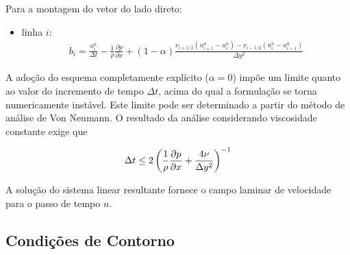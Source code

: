 Para a montagem do vetor do lado direto:

\begin{itemize}
	\item{linha $i$:}
		\begin{eqnarray}
			b_i = \frac{u_i^{n}}{\Delta t} 
			-\frac{1}{\rho}\frac{\partial p}{\partial x} 
			+(1-\alpha)\frac{\nu_{i+1/2}(u_{i+1}^n-u_{i}^n)
			-\nu_{i-1/2}(u_{i}^n-u_{i-1}^n)}{\Delta y^2}
			\label{eq:perfil_turbulento_discr}
		\end{eqnarray}
\end{itemize}

A adoção do esquema completamente explícito ($\alpha=0$) impõe um limite quanto ao valor do incremento de tempo $\Delta t$, acima do qual a formulação se torna numericamente instável. Este limite pode ser determinado a partir do método de análise de Von Neumann. O resultado da análise considerando viscosidade constante exige que

\begin{equation}
	\Delta t\leq 2\left(\frac{1}{\rho}\frac{\partial p}{\partial x}+\frac{4\nu}{\Delta y^2}\right)^{-1}
\end{equation}

A solução do sistema linear resultante fornece o campo laminar de velocidade para o passo de tempo $n$.

%
%
%
%

\subsection{Condições de Contorno}


